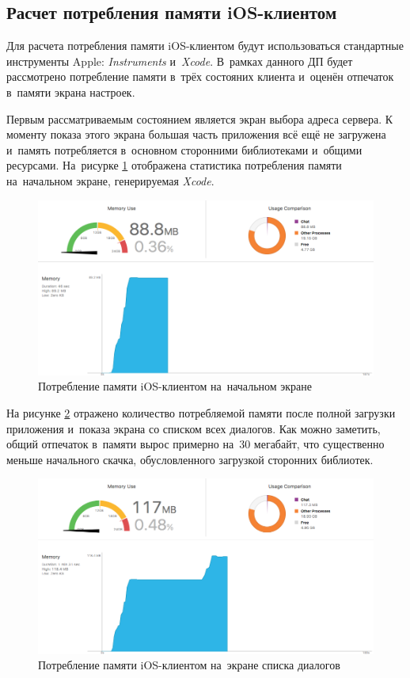 \subsection{Расчет потребления памяти iOS-клиентом}
\label{sec:eng:memory}

Для расчета потребления памяти iOS-клиентом будут использоваться стандартные инструменты Apple: \textit{Instruments} и~\textit{Xcode}. В~рамках данного ДП будет рассмотрено потребление памяти в~трёх состояних клиента и~оценён отпечаток в~памяти экрана настроек.

Первым рассматриваемым состоянием является экран выбора адреса сервера. К моменту показа этого экрана большая часть приложения всё ещё не загружена и~память потребляется в~основном сторонними библиотеками и~общими ресурсами. На~рисурке \ref{sec:eng:memory:initial} отображена статистика потребления памяти на~начальном экране, генерируемая \textit{Xcode}.

\begin{figure}[h]
  \centering
    \includegraphics[width=1\textwidth]{inc/img/memory_initial.png}
  \caption{Потребление памяти iOS-клиентом на~начальном экране}
  \label{sec:eng:memory:initial}
\end{figure}

На рисунке \ref{sec:eng:memory:used} отражено количество потребляемой памяти после полной загрузки приложения и~показа экрана со списком всех диалогов. Как можно заметить, общий отпечаток в~памяти вырос примерно на~30 мегабайт, что существенно меньше начального скачка, обусловленного загрузкой сторонних библиотек.

\begin{figure}[h]
  \centering
    \includegraphics[width=1\textwidth]{inc/img/memory_used.png}
  \caption{Потребление памяти iOS-клиентом на~экране списка диалогов}
  \label{sec:eng:memory:used}
\end{figure}

